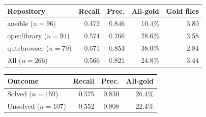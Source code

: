 %
%
\begin{tabular}{@{}lrrrr@{}}
\toprule
Repository & Recall & Prec. & All-gold & Gold files \\
\midrule
ansible ($n{=}96$)     & 0.472 & 0.846 & 10.4\% & 3.80 \\
openlibrary ($n{=}91$) & 0.574 & 0.766 & 28.6\% & 3.58 \\
qutebrowser ($n{=}79$) & 0.671 & 0.853 & 38.0\% & 2.84 \\
\midrule
All ($n{=}266$)        & 0.566 & 0.821 & 24.8\% & 3.44 \\
\bottomrule
\end{tabular}

\vspace{4pt}

\begin{tabular}{@{}lrrr@{}}
\toprule
Outcome & Recall & Prec. & All-gold \\
\midrule
Solved ($n{=}159$)   & 0.575 & 0.830 & 26.4\% \\
Unsolved ($n{=}107$) & 0.552 & 0.808 & 22.4\% \\
\bottomrule
\end{tabular}
